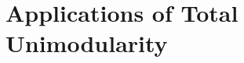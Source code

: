 \documentclass[main]{subfiles}
\begin{document}

\section{Applications of Total Unimodularity}
\end{document}
